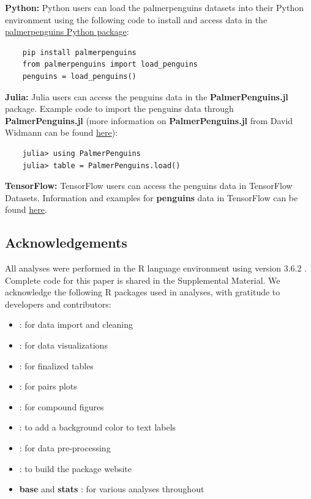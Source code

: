 \textbf{Python:} Python users can load the palmerpenguins datasets into
their Python environment using the following code to install and access
data in the
\href{https://pypi.org/project/palmerpenguins/}{palmerpenguins Python
package}:

\begin{verbatim}
    pip install palmerpenguins
    from palmerpenguins import load_penguins
    penguins = load_penguins()
\end{verbatim}

\textbf{Julia:} Julia users can access the penguins data in the
\textbf{PalmerPenguins.jl} package. Example code to import the penguins
data through \textbf{PalmerPenguins.jl} (more information on
\textbf{PalmerPenguins.jl} from David Widmann can be found
\href{https://github.com/devmotion/PalmerPenguins.jl}{here}):

\begin{verbatim}
    julia> using PalmerPenguins
    julia> table = PalmerPenguins.load()
\end{verbatim}

\textbf{TensorFlow:} TensorFlow users can access the penguins data in
TensorFlow Datasets. Information and examples for \textbf{penguins} data
in TensorFlow can be found
\href{https://www.tensorflow.org/datasets/catalog/penguins}{here}.

\hypertarget{acknowledgements}{%
\subsection{Acknowledgements}\label{acknowledgements}}

All analyses were performed in the R language environment using version
3.6.2 \citep{r_core_team_r_2019}. Complete code for this paper is shared
in the Supplemental Material. We acknowledge the following R packages
used in analyses, with gratitude to developers and contributors:

\begin{itemize}
\tightlist
\item
   \citep{wickham_welcome_2019}: for data import and
  cleaning
\item
   \citep{wickham_ggplot2_2016}: for data
  visualizations
\item
   \citep{zhu_kableextra_2019}: for finalized tables
\item
   \citep{schloerke_ggally_2020}: for pairs plots
\item
   \citep{pedersen_patchwork_2019}: for compound
  figures
\item
   \citep{yu_shadowtext_2019}: to add a background
  color to text labels
\item
   \citep{kuhn_recipes_2020}: for data pre-processing
\item
   \citep{wickham_pkgdown_2020}: to build the package
  website
\item
  \textbf{base} and \textbf{stats} \citep{r_core_team_r_2019}: for
  various analyses throughout
\end{itemize}


